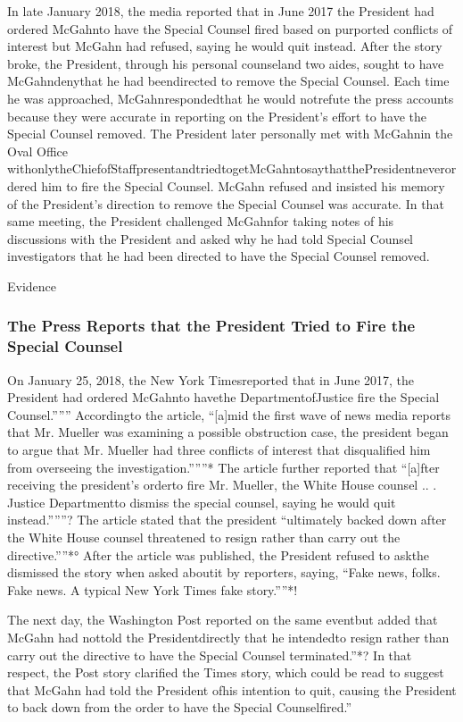 In late January 2018, the media reported that in June 2017 the President had ordered McGahnto have the Special Counsel fired based on purported conflicts of interest but McGahn had refused, saying he would quit instead. After the story broke, the President, through his personal counseland two aides, sought to have McGahndenythat he had beendirected to remove the Special Counsel. Each time he was approached, McGahnrespondedthat he would notrefute the press accounts because they were accurate in reporting on the President’s effort to have the Special Counsel removed. The President later personally met with McGahnin the Oval Office withonlytheChiefofStaffpresentandtriedtogetMcGahntosaythatthePresidentneverordered him to fire the Special Counsel. McGahn refused and insisted his memory of the President’s direction to remove the Special Counsel was accurate. In that same meeting, the President challenged McGahnfor taking notes of his discussions with the President and asked why he had told Special Counsel investigators that he had been directed to have the Special Counsel removed.

Evidence

\subsubsection{The Press Reports that the President Tried to Fire the Special Counsel}

On January 25, 2018, the New York Timesreported that in June 2017, the President had ordered McGahnto havethe DepartmentofJustice fire the Special Counsel.””” Accordingto the article, “[a]mid the first wave of news media reports that Mr. Mueller was examining a possible obstruction case, the president began to argue that Mr. Mueller had three conflicts of interest that disqualified him from overseeing the investigation.”””* The article further reported that “[a]fter
receiving the president’s orderto fire Mr. Mueller, the White House counsel .. .
Justice Departmentto dismiss the special counsel, saying he would quit instead.”””? The article stated that the president “ultimately backed down after the White House counsel threatened to resign rather than carry out the directive.””*° After the article was published, the President
refused to askthe
dismissed the story when asked aboutit by reporters, saying, “Fake news, folks. Fake news. A typical New York Times fake story.””*!

The next day, the Washington Post reported on the same eventbut added that McGahn had nottold the Presidentdirectly that he intendedto resign rather than carry out the directive to have the Special Counsel terminated.”*? In that respect, the Post story clarified the Times story, which could be read to suggest that McGahn had told the President ofhis intention to quit, causing the President to back down from the order to have the Special Counselfired.”

